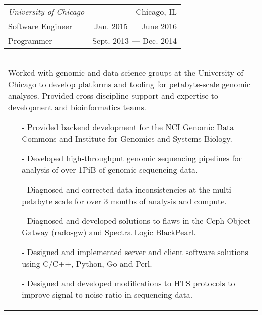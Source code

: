 \begin{tabularx}{\textwidth}{L R}
    \normalsize\textit{University of Chicago} & Chicago, IL \\
    \hspace{10pt}Software Engineer & Jan. 2015 --- June 2016 \\
    \hspace{10pt}Programmer & Sept. 2013 --- Dec. 2014 \\
\end{tabularx}
\begin{tabularx}{\textwidth}{X}
    \vspace{1pt}
    Worked with genomic and data science groups at the University of Chicago to develop platforms and tooling for petabyte-scale genomic analyses. Provided cross-discipline support and expertise to development and bioinformatics teams.
    \begin{itemize}
        \itemsep{}
        \item[-] Provided backend development for the NCI Genomic Data Commons and Institute for Genomics and Systems Biology.
        \item[-] Developed high-throughput genomic sequencing pipelines for analysis of over 1PiB of genomic sequencing data.
        \item[-] Diagnosed and corrected data inconsistencies at the multi-petabyte scale for over 3 months of analysis and compute.
        \item[-] Diagnosed and developed solutions to flaws in the Ceph Object Gatway (radosgw) and Spectra Logic BlackPearl.
        \item[-] Designed and implemented server and client software solutions using C/C++, Python, Go and Perl.
        \item[-] Designed and developed modifications to HTS protocols to improve signal-to-noise ratio in sequencing data.
    \end{itemize}
\end{tabularx}
